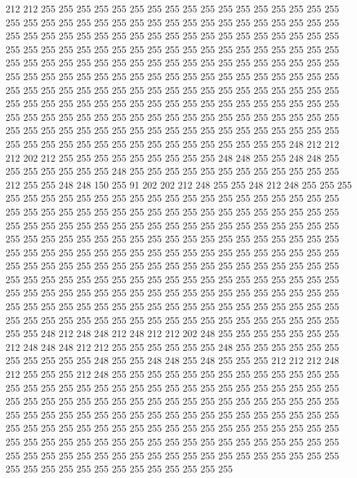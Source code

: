 212 212 255 255 255 255 255 255 255 255 255 255 255 255 255 255 255 255 255 255
255 255 255 255 255 255 255 255 255 255 255 255 255 255 255 255 255 255 255 255
255 255 255 255 255 255 255 255 255 255 255 255 255 255 255 255 255 255 255 255
255 255 255 255 255 255 255 255 255 255 255 255 255 255 255 255 255 255 255 255
255 255 255 255 255 255 255 255 255 255 255 255 255 255 255 255 255 255 255 255
255 255 255 255 255 255 255 255 255 255 255 255 255 255 255 255 255 255 255 255
255 255 255 255 255 255 255 255 255 255 255 255 255 255 255 255 255 255 255 255
255 255 255 255 255 255 255 255 255 255 255 255 255 255 255 255 255 255 255 255
255 255 255 255 255 255 255 255 255 255 255 255 255 255 255 255 255 255 255 255
255 255 255 255 255 255 255 255 255 255 255 255 255 255 255 255 255 255 255 255
255 255 255 255 255 255 248 212 212 212 202 212 255 255 255 255 255 255 255 255
255 248 248 255 255 248 248 255 255 255 255 255 255 255 248 255 255 255 255 255
255 255 255 255 255 255 255 212 255 255 248 248 150 255 91 202 202 212 248 255
255 248 212 248 255 255 255 255 255 255 255 255 255 255 255 255 255 255 255 255
255 255 255 255 255 255 255 255 255 255 255 255 255 255 255 255 255 255 255 255
255 255 255 255 255 255 255 255 255 255 255 255 255 255 255 255 255 255 255 255
255 255 255 255 255 255 255 255 255 255 255 255 255 255 255 255 255 255 255 255
255 255 255 255 255 255 255 255 255 255 255 255 255 255 255 255 255 255 255 255
255 255 255 255 255 255 255 255 255 255 255 255 255 255 255 255 255 255 255 255
255 255 255 255 255 255 255 255 255 255 255 255 255 255 255 255 255 255 255 255
255 255 255 255 255 255 255 255 255 255 255 255 255 255 255 255 255 255 255 255
255 255 255 255 255 255 255 255 255 255 255 255 255 255 255 255 255 255 255 255
255 255 255 255 255 255 255 255 255 255 255 255 255 255 255 255 255 255 255 248
212 248 248 212 248 212 212 202 248 255 255 255 255 255 255 255 212 248 248 248
212 212 255 255 255 255 255 255 248 255 255 255 255 255 255 255 255 255 255 255
248 255 255 248 248 255 248 255 255 255 212 212 212 248 212 255 255 255 212 248
255 255 255 255 255 255 255 255 255 255 255 255 255 255 255 255 255 255 255 255
255 255 255 255 255 255 255 255 255 255 255 255 255 255 255 255 255 255 255 255
255 255 255 255 255 255 255 255 255 255 255 255 255 255 255 255 255 255 255 255
255 255 255 255 255 255 255 255 255 255 255 255 255 255 255 255 255 255 255 255
255 255 255 255 255 255 255 255 255 255 255 255 255 255 255 255 255 255 255 255
255 255 255 255 255 255 255 255 255 255 255 255 255 255 255 255 255 255 255 255
255 255 255 255 255 255 255 255 255 255 255 255 255 255 255 255 255 255 255 255
